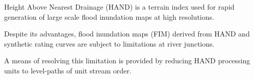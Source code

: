 

%
\begin{keypoints}
\item Height Above Nearest Drainage (HAND) is a terrain index used for rapid generation of large scale flood inundation maps at high resolutions.
\item Despite its advantages, flood inundation maps (FIM) derived from HAND and synthetic rating curves are subject to limitations at river junctions.
\item A means of resolving this limitation is provided by reducing HAND processing units to level-paths of unit stream order.
\end{keypoints}
%
